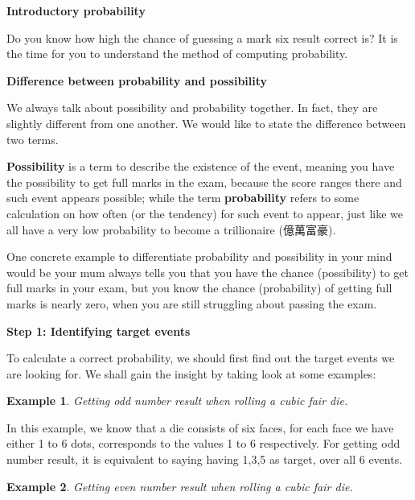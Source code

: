 \documentclass[12pt]{article}
\newtheorem{example}{Example}
\begin{document}
    \begin{center}
        \textbf{Introductory probability}
    \end{center}

    Do you know how high the chance of guessing a mark six result correct is? It is the time for you to understand the method of computing probability.
    
    \begin{center}
        \textbf{Difference between probability and possibility}
    \end{center}

    We always talk about possibility and probability together. In fact, they are slightly different from one another. We would like to state the difference between two terms.

    \textbf{Possibility} is a term to describe the existence of the event, meaning you have the possibility to get full marks in the exam, because the score ranges there and such event appears possible; while the term \textbf{probability} refers to some calculation on how often (or the tendency) for such event to appear, just like we all have a very low probability to become a trillionaire (億萬富豪).

    One concrete example to differentiate probability and possibility in your mind would be your mum always tells you that you have the chance (possibility) to get full marks in your exam, but you know the chance (probability) of getting full marks is nearly zero, when you are still struggling about passing the exam.

    \begin{center}
        \textbf{Step 1: Identifying target events}
    \end{center}

    To calculate a correct probability, we should first find out the target events we are looking for. We shall gain the insight by taking look at some examples:

    \begin{example}
        Getting odd number result when rolling a cubic fair die.
    \end{example}

    In this example, we know that a die consists of six faces, for each face we have either 1 to 6 dots, corresponds to the values 1 to 6 respectively. For getting odd number result, it is equivalent to saying having 1,3,5 as target, over all 6 events.

    \begin{example}
        Getting even number result when rolling a cubic fair die.
    \end{example}
\end{document}
